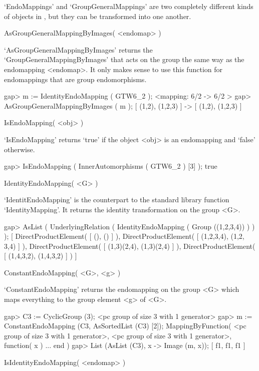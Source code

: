 `EndoMappings' and `GroupGeneralMappings' are two completely different
kinds of objects in {\GAP}, but they can be transformed into one
another.

\>AsGroupGeneralMappingByImages( <endomap> )

`AsGroupGeneralMappingByImages' returns the
`GroupGeneralMappingByImages' that acts on the group the same way as
the endomapping <endomap>. It only makes sense to use this function
for endomappings that are group endomorphisms.

\beginexample
    gap> m := IdentityEndoMapping ( GTW6_2 );
    <mapping: 6/2 -> 6/2 >
    gap> AsGroupGeneralMappingByImages ( m );
    [ (1,2), (1,2,3) ] -> [ (1,2), (1,2,3) ]
\endexample

\>IsEndoMapping( <obj> )

`IsEndoMapping' returns `true' if the object <obj> is an endomapping
and `false' otherwise.

\beginexample
    gap> IsEndoMapping ( InnerAutomorphisms ( GTW6_2 ) [3] );
    true
\endexample

\>IdentityEndoMapping( <G> )

`IdentitEndoMapping' is the counterpart to the {\GAP} standard
library function `IdentityMapping'. It returns the identity
transformation on the group <G>.

\beginexample
    gap> AsList ( UnderlyingRelation ( IdentityEndoMapping ( Group ((1,2,3,4)) ) ) );
    [ DirectProductElement( [ (), () ] ), DirectProductElement( [ (1,2,3,4), (1,2,
       3,4) ] ), DirectProductElement( [ (1,3)(2,4), (1,3)(2,4) ] ),
      DirectProductElement( [ (1,4,3,2), (1,4,3,2) ] ) ]
\endexample

\>ConstantEndoMapping( <G>, <g> )

`ConstantEndoMapping' returns the endomapping on the group <G>
which maps everything to the group element <g> of <G>.

\beginexample
    gap> C3 := CyclicGroup (3);
    <pc group of size 3 with 1 generator>
    gap> m := ConstantEndoMapping (C3, AsSortedList (C3) [2]);
    MappingByFunction( <pc group of size 3 with 
    1 generator>, <pc group of size 3 with 
    1 generator>, function( x ) ... end )
    gap> List (AsList (C3), x -> Image (m, x));
    [ f1, f1, f1 ]
\endexample




\>IsIdentityEndoMapping( <endomap> )

